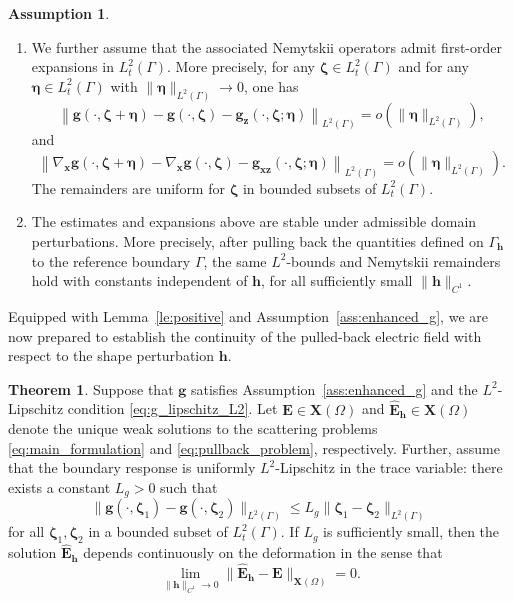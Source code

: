 \documentclass[12pt,reqno]{amsart}
\theoremstyle{definition}
\newtheorem{theo}{Theorem}[section]
\newtheorem{assu}{Assumption}
\numberwithin{equation}{section}
\begin{document}
\begin{assu}
\begin{enumerate}
\item[\textup{(A3)}]
We further assume that the associated Nemytskii operators admit first-order
expansions in \(L_t^2(\Gamma)\). More precisely, for any
\(\boldsymbol\zeta\in L_t^2(\Gamma)\) and for any
\(\boldsymbol\eta\in L_t^2(\Gamma)\) with
\(\|\boldsymbol\eta\|_{L^2(\Gamma)}\to0\), one has
\[
\left\|\mathbf g(\cdot,\boldsymbol\zeta+\boldsymbol\eta)-
\mathbf g(\cdot,\boldsymbol\zeta)-\mathbf g_{\boldsymbol z}
(\cdot,\boldsymbol\zeta;\boldsymbol\eta)
\right\|_{L^2(\Gamma)}
=o(\|\boldsymbol\eta\|_{L^2(\Gamma)}),
\]
and
\[
\left\|\nabla_{\boldsymbol x}\mathbf g
(\cdot,\boldsymbol\zeta+\boldsymbol\eta)-
\nabla_{\boldsymbol x}\mathbf g(\cdot,\boldsymbol\zeta)
-\mathbf g_{\boldsymbol x\boldsymbol z}
(\cdot,\boldsymbol\zeta;\boldsymbol\eta)
\right\|_{L^2(\Gamma)}
=o(\|\boldsymbol\eta\|_{L^2(\Gamma)}).
\]
The remainders are uniform for
\(\boldsymbol\zeta\) in bounded subsets of \(L_t^2(\Gamma)\).
\item[\textup{(A4)}]
The estimates and expansions above are stable under admissible domain
perturbations. More precisely, after pulling back the quantities defined on
\(\Gamma_{\mathbf h}\) to the reference boundary \(\Gamma\), the same
\(L^2\)-bounds and Nemytskii remainders hold with constants independent of
\(\mathbf h\), for all sufficiently small \(\|\mathbf h\|_{C^1}\).
\end{enumerate}
\end{assu}
Equipped with Lemma~\ref{le:positive} and Assumption~\ref{ass:enhanced_g}, we are now prepared to establish the continuity of the pulled-back electric field with respect to the shape perturbation $\mathbf{h}$.

\begin{theo}\label{th:continuity_domain_dependence}
Suppose that $\mathbf{g}$ satisfies Assumption~\ref{ass:enhanced_g} and the $L^2$-Lipschitz condition \eqref{eq:g_lipschitz_L2}. Let $\mathbf{E} \in \mathbf{X}(\Omega)$ and $\hat{\mathbf{E}}_{\mathbf{h}} \in \mathbf{X}(\Omega)$ denote the unique weak solutions to the scattering problems \eqref{eq:main_formulation} and \eqref{eq:pullback_problem}, respectively. Further, assume that the boundary response is uniformly $L^2$-Lipschitz in the trace variable: there exists a constant $L_g > 0$ such that
\[
\|\mathbf{g}(\cdot, \boldsymbol{\zeta}_1) - \mathbf{g}(\cdot, \boldsymbol{\zeta}_2)\|_{L^2(\Gamma)} \le L_g \|\boldsymbol{\zeta}_1 - \boldsymbol{\zeta}_2\|_{L^2(\Gamma)}
\]
for all $\boldsymbol{\zeta}_1, \boldsymbol{\zeta}_2$ in a bounded subset of $L_t^2(\Gamma)$. If $L_g$ is sufficiently small, then the solution $\hat{\mathbf{E}}_{\mathbf{h}}$ depends continuously on the deformation in the sense that
\begin{equation}
\label{eq:continuity_limit}
\lim_{\|\mathbf{h}\|_{C^1} \to 0} \|\hat{\mathbf{E}}_{\mathbf{h}} - \mathbf{E}\|_{\mathbf{X}(\Omega)} = 0.
\end{equation}
\end{theo}
\end{document}
